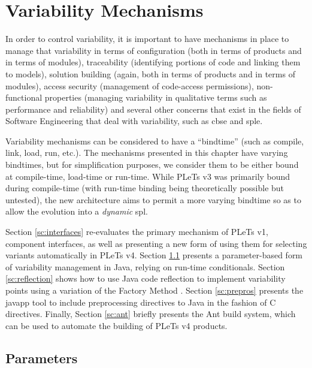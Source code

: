 \chapter{Variability Mechanisms}
\label{ch:mechanisms}

In order to control variability, it is important to have mechanisms in place to manage that variability in terms of configuration (both in terms of products and in terms of modules), traceability (identifying portions of code and linking them to models), solution building (again, both in terms of products and in terms of modules), access security (management of code-access permissions), non-functional properties (managing variability in qualitative terms such as performance and reliability) and several other concerns that exist in the fields of Software Engineering that deal with variability, such as \acrfull{cbse} and \acrfull{sple}.

Variability mechanisms can be considered to have a ``\gls{bindtime}'' (such as compile, link, load, run, etc.). The mechanisms presented in this chapter have varying \gls{bindtime}s, but for simplification purposes, we consider them to be either bound at compile-time, load-time or run-time. While PLeTs v3 was primarily bound during compile-time (with run-time binding being theoretically possible but untested), the new architecture aims to permit a more varying \gls{bindtime} so as to allow the evolution into a \emph{dynamic} \acrshort{spl}.

Section \ref{sc:interfaces} re-evaluates the primary mechanism of PLeTs v1, component interfaces, as well as presenting a new form of using them for selecting \gls{variant}s automatically in PLeTs v4. Section \ref{sc:params} presents a parameter-based form of \gls{variability} management in Java, relying on run-time conditionals. Section \ref{sc:reflection} shows how to use Java code reflection to implement \gls{variability} points using a variation of the Factory Method \cite{GAMMA:1995}. Section \ref{sc:prepros} presents the javapp tool \cite{KROPF:2015} to include preprocessing directives to Java in the fashion of C directives. Finally, Section \ref{sc:ant} briefly presents the Ant build system, which can be used to automate the building of PLeTs v4 products.


\section{Parameters}
\label{sc:params}

